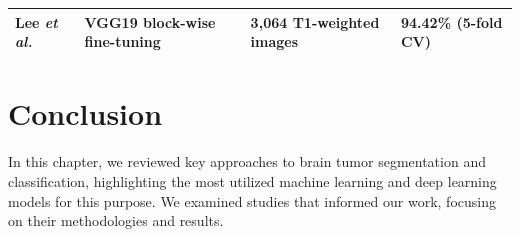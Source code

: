 \begin{table}[ht]
\begin{tabular}{p{} p{} p{} p{}}
    \hline
    \vspace{0.1cm} Lee \emph{et al.}~\cite{swati2019transfer}  &
    \vspace{0.1cm} VGG19 block-wise fine-tuning                &
    \vspace{0.1cm} 3,064 T1-weighted images                    &
    \vspace{0.1cm} 94.42\% (5-fold CV)                                                                                       \\
    \hline
  \end{tabular}
\end{table}

\section{Conclusion}
In this chapter, we reviewed key approaches to brain tumor segmentation and classification, highlighting the most utilized machine learning and deep learning models for this purpose. We examined studies that informed our work, focusing on their methodologies and results.

